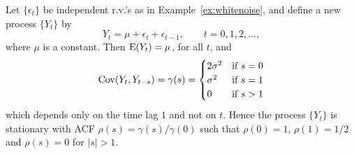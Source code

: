 \begin{ex} \label{ex:movingaverage} Let $\{ \epsilon_t \}$ be independent r.v.'s as in Example~\ref{ex:whitenoise}, and define a new process $\{ Y_t \}$ by
	\[
	Y_t = \mu + \epsilon_t + \epsilon_{t-1}, \qquad t=0, 1, 2, \ldots,
	\]
where $\mu$ is a constant.  Then $\operatorname{E}(Y_t)= \mu$, for all $t$, and
	\[
	\operatorname{Cov}(Y_t,Y_{t-s})= \gamma(s) =
	\begin{cases}
	2 \sigma^2 & \text{if } s= 0 \\
	\sigma^2 & \text{if } s= 1 \\
	0 & \text{if } s > 1
	\end{cases}
	\]
which depends only on the time lag $1$ and not on $t$.  Hence the process $\{ Y_t \}$ is stationary with ACF $\rho(s)= \gamma(s)/\gamma(0)$ such that $\rho(0)= 1$, $\rho(1)= 1/2$ and $\rho(s)= 0$ for $\lvert s \rvert > 1$.
 
	\begin{figure}
                        \hfill
                        

\end{figure}
\end{ex}
